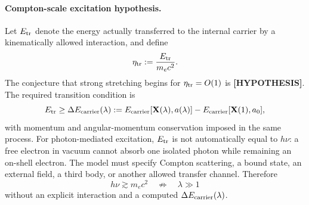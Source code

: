 \paragraph{Compton-scale excitation hypothesis.}
Let $E_{\rm tr}$ denote the energy actually transferred to the internal carrier
by a kinematically allowed interaction, and define
\begin{equation}
    \eta_{\rm tr}
    :=
    \frac{E_{\rm tr}}{m_ec^2}.
    \label{eq:rt_compton_transfer_parameter}
\end{equation}
The conjecture that strong stretching begins for
$\eta_{\rm tr}=O(1)$ is \textbf{[HYPOTHESIS]}.  The required transition condition
is
\begin{equation}
    E_{\rm tr}
    \ge
    \Delta E_{\rm carrier}(\lambda)
    :=
    E_{\rm carrier}[\mathbf X(\lambda),a(\lambda)]
    -
    E_{\rm carrier}[\mathbf X(1),a_0],
    \label{eq:rt_stretch_energy_gate}
\end{equation}
with momentum and angular-momentum conservation imposed in the same process.
For photon-mediated excitation, $E_{\rm tr}$ is not automatically equal to
$h\nu$: a free electron in vacuum cannot absorb one isolated photon while
remaining an on-shell electron.  The model must specify Compton scattering, a
bound state, an external field, a third body, or another allowed transfer
channel.  Therefore
\begin{equation}
    h\nu\gtrsim m_ec^2
    \quad\not\Rightarrow\quad
    \lambda\gg1
    \label{eq:rt_compton_not_automatic_stretch}
\end{equation}
without an explicit interaction and a computed
$\Delta E_{\rm carrier}(\lambda)$.

